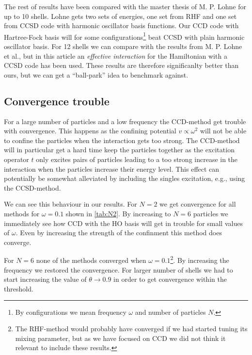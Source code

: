 \documentclass[
    a4paper, aps, twocolumn, floatfix, superscriptaddress,
    nofootinbib]{revtex4-1}
\newcommand{\1}{\mathds{1}}
\begin{document}
        The rest of results have been compared with the master thesis of M. P.
        Lohne\cite{lohne2010coupled} for up to 10 shells. Lohne gets two sets of
        energies, one set from RHF and one set from CCSD code with harmonic
        oscillator basis functions. Our CCD code with Hartree-Fock basis will
        for some configurations\footnote{By configurations we mean frequency
        $\omega$ and number of particles $N$.} beat CCSD with plain harmonic
        oscillator basis. For 12 shells we can compare with the results from M.
        P. Lohne et al.\cite{lohne2011ab}, but in this article an
        \emph{effective interaction} for the Hamiltonian with a CCSD code has
        been used. These results are therefore significanlty better than ours,
        but we can get a ``ball-park'' idea to benchmark against.

    \subsection{Convergence trouble}
        For a large number of particles and a low frequency the CCD-method get
        trouble with convergence. This happens as the confining potential $v
        \propto \omega^2$ will not be able to confine the particles when the
        interaction gets too strong. The CCD-method will in particular get a
        hard time keep the particles together as the excitation operator $t$
        only excites pairs of particles leading to a too strong increase in the
        interaction when the particles increase their energy level. This effect
        can potentially be somewhat alleviated by including the singles
        excitation, e.g., using the CCSD-method.

        We can see this behaviour in our results. For $N = 2$ we get convergence
        for all methods for $\omega = 0.1$ shown in \autoref{tab:N2}. By
        increasing to $N = 6$ particles we immediately see how CCD with the HO
        basis will get in trouble for small values of $\omega$. Even by increasing
        the strength of the confinment this method does converge.

        For $N = 6$ none of the methods converged when $\omega =
        0.1$\footnote{The RHF-method would probably have converged if we had
        started tuning its mixing parameter, but as we have focused on CCD we did
        not think it relevant to include these results.}. By increasing the
        frequency we restored the convergence. For larger number of shells we
        had to start increasing the value of $\theta \to 0.9$ in order to get
        convergence within the threshold.
\end{document}
